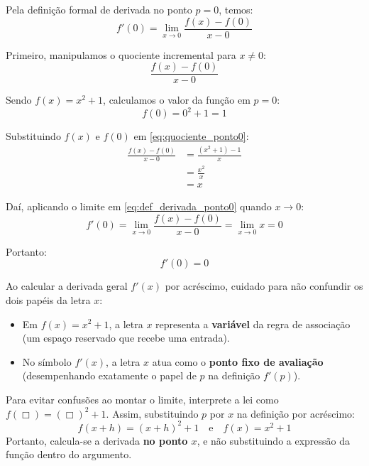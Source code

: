 \begin{enumerate}[label=\alph*)]
    Pela definição formal de derivada no ponto $p = 0$, temos:
    \begin{equation}
        f'(0) = \lim_{x \to 0} \frac{f(x) - f(0)}{x - 0} \label{eq:def_derivada_ponto0}
    \end{equation}

    Primeiro, manipulamos o quociente incremental para $x \neq 0$:
    \begin{equation}
        \frac{f(x) - f(0)}{x - 0} \label{eq:quociente_ponto0}
    \end{equation}

    Sendo $f(x) = x^2 + 1$, calculamos o valor da função em $p = 0$:
    \[
    f(0) = 0^2 + 1 = 1
    \]

    Substituindo $f(x)$ e $f(0)$ em \eqref{eq:quociente_ponto0}:
    \begin{align*}
        \frac{f(x) - f(0)}{x - 0} &= \frac{(x^2 + 1) - 1}{x} \\[0.20cm]
        &= \frac{x^2}{x} \\[0.20cm]
        &= x
    \end{align*}

    Daí, aplicando o limite em \eqref{eq:def_derivada_ponto0} quando $x \to 0$:
    \[
    f'(0) = \lim_{x \to 0} \frac{f(x) - f(0)}{x - 0} = \lim_{x \to 0} x = 0
    \]

    Portanto:
    \[
    f'(0) = 0
    \]


    \begin{dicasbox}[title={Atenção: A Notação $f'(x)$ e a Mudança de Papel de $x$}]
        Ao calcular a derivada geral $f'(x)$ por acréscimo, cuidado para não confundir os dois papéis da letra $x$:
        \begin{itemize}[noitemsep, topsep=3pt]
            \item Em $f(x) = x^2 + 1$, a letra $x$ representa a \textbf{variável} da regra de associação (um espaço reservado que recebe uma entrada).
            \item No símbolo $f'(x)$, a letra $x$ atua como o \textbf{ponto fixo de avaliação} (desempenhando exatamente o papel de $p$ na definição $f'(p)$).
        \end{itemize}
        \vspace{0.15cm}
        Para evitar confusões ao montar o limite, interprete a lei como $f(\Box) = (\Box)^2 + 1$. Assim, substituindo $p$ por $x$ na definição por acréscimo:
        \[
        f(x + h) = (x + h)^2 + 1 \quad \text{e} \quad f(x) = x^2 + 1
        \]
        Portanto, calcula-se a derivada \textbf{no ponto $x$}, e não substituindo a expressão da função dentro do argumento.
    \end{dicasbox}


\end{enumerate}
